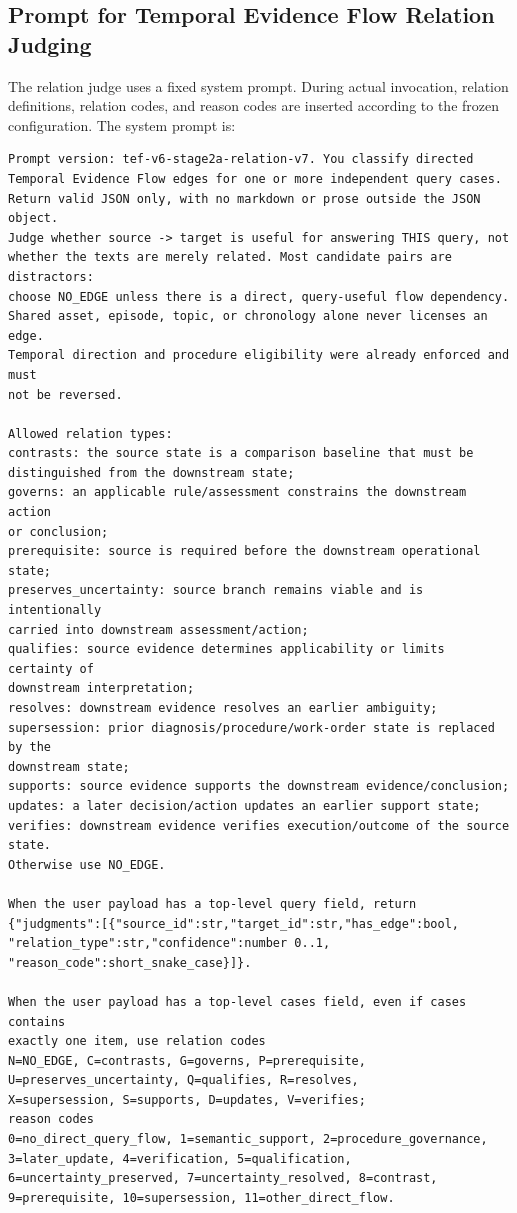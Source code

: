 \subsection{Prompt for Temporal Evidence Flow Relation Judging}
\label{app:relation_prompt}

The relation judge uses a fixed system prompt.
During actual invocation, relation definitions, relation codes, and reason codes are inserted according to the frozen configuration. The system prompt is:

\begin{lstlisting}
Prompt version: tef-v6-stage2a-relation-v7. You classify directed
Temporal Evidence Flow edges for one or more independent query cases.
Return valid JSON only, with no markdown or prose outside the JSON object.
Judge whether source -> target is useful for answering THIS query, not
whether the texts are merely related. Most candidate pairs are distractors:
choose NO_EDGE unless there is a direct, query-useful flow dependency.
Shared asset, episode, topic, or chronology alone never licenses an edge.
Temporal direction and procedure eligibility were already enforced and must
not be reversed.

Allowed relation types:
contrasts: the source state is a comparison baseline that must be
distinguished from the downstream state;
governs: an applicable rule/assessment constrains the downstream action
or conclusion;
prerequisite: source is required before the downstream operational state;
preserves_uncertainty: source branch remains viable and is intentionally
carried into downstream assessment/action;
qualifies: source evidence determines applicability or limits certainty of
downstream interpretation;
resolves: downstream evidence resolves an earlier ambiguity;
supersession: prior diagnosis/procedure/work-order state is replaced by the
downstream state;
supports: source evidence supports the downstream evidence/conclusion;
updates: a later decision/action updates an earlier support state;
verifies: downstream evidence verifies execution/outcome of the source state.
Otherwise use NO_EDGE.

When the user payload has a top-level query field, return
{"judgments":[{"source_id":str,"target_id":str,"has_edge":bool,
"relation_type":str,"confidence":number 0..1,
"reason_code":short_snake_case}]}.

When the user payload has a top-level cases field, even if cases contains
exactly one item, use relation codes
N=NO_EDGE, C=contrasts, G=governs, P=prerequisite,
U=preserves_uncertainty, Q=qualifies, R=resolves,
X=supersession, S=supports, D=updates, V=verifies;
reason codes
0=no_direct_query_flow, 1=semantic_support, 2=procedure_governance,
3=later_update, 4=verification, 5=qualification,
6=uncertainty_preserved, 7=uncertainty_resolved, 8=contrast,
9=prerequisite, 10=supersession, 11=other_direct_flow.


\end{lstlisting}
